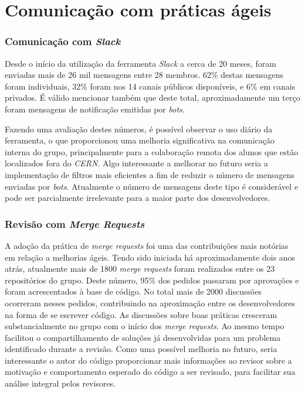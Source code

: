 \hypertarget{praticas-ageis}{%
\section{Comunicação com práticas ágeis}\label{praticas-ageis}}

\hypertarget{comunicacao-com-slack}{%
\subsubsection{\texorpdfstring{Comunicação com \emph{Slack}}{Comunicação com Slack}}\label{comunicacao-com-slack}}

Desde o início da utilização da ferramenta \emph{Slack} a cerca de 20 meses, foram enviadas mais de 26 mil mensagens entre 28 membros. 62\% destas mensagens foram individuais, 32\% foram nos 14 canais públicos disponíveis, e 6\% em canais privados. É válido mencionar também que deste total, aproximadamente um terço foram mensagens de notificação emitidas por \emph{bots}.

Fazendo uma avaliação destes números, é possível observar o uso diário da ferramenta, o que proporcionou uma melhoria significativa na comunicação interna do grupo, principalmente para a colaboração remota dos alunos que estão localizados fora do \emph{CERN}. Algo interessante a melhorar no futuro seria a implementação de filtros mais eficientes a fim de reduzir o número de mensagens enviadas por \emph{bots}. Atualmente o número de mensagens deste tipo é considerável e pode ser parcialmente irrelevante para a maior parte dos desenvolvedores.

\hypertarget{revisao-com-merge-requests}{%
\subsubsection{\texorpdfstring{Revisão com \emph{Merge Requests}}{Revisão com Merge Requests}}\label{revisao-com-merge-requests}}

A adoção da prática de \emph{merge requests} foi uma das contribuições mais notórias em relação a melhorias ágeis. Tendo sido iniciada há aproximadamente dois anos atrás, atualmente mais de 1800 \emph{merge requests} foram realizados entre os 23 repositórios do grupo. Deste número, 95\% dos pedidos passaram por aprovações e foram acrescentados à base de código. No total mais de 2000 discussões ocorreram nesses pedidos, contribuindo na aproximação entre os desenvolvedores na forma de se escrever código. As discussões sobre boas práticas cresceram substancialmente no grupo com o início dos \emph{merge requests}. Ao mesmo tempo facilitou o compartilhamento de soluções já desenvolvidas para um problema identificado durante a revisão. Como uma possível melhoria no futuro, seria interessante o autor do código proporcionar mais informações ao revisor sobre a motivação e comportamento esperado do código a ser revisado, para facilitar sua análise integral pelos revisores.

